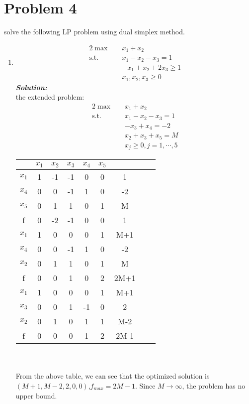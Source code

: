 \documentclass[paper=a4, fontsize=11pt]{scrartcl} %
\numberwithin{equation}{section} %
\numberwithin{figure}{section} %
\numberwithin{table}{section} %
\begin{document}
\section{Problem 4}
solve the following LP problem using dual simplex method.
\begin{enumerate}
\item
\begin{alignat}{2}          \nonumber
\max\quad & x_1+x_2 \\    \nonumber
\mbox{s.t.}\quad            \nonumber
& x_1-x_2-x_3 = 1\\        \nonumber
& -x_1+x_2+2x_3 \geq 1\\         \nonumber
& x_1,x_2,x_3 \geq 0
\end{alignat}
\emph{\textbf{Solution:}}\\
the extended problem:\\
\begin{alignat}{2}          \nonumber
\max\quad & x_1+x_2 \\    \nonumber
\mbox{s.t.}\quad            \nonumber
& x_1-x_2-x_3 = 1\\        \nonumber
& -x_3+x_4= -2\\         \nonumber
& x_2+x_3+x_5 = M\\          \nonumber
& x_j \geq 0, j = 1,\cdots,5
\end{alignat}

\begin{tabular}{|c|c|c|c|c|c|c|c|c|}
\hline &$x_1$&$x_2$&$x_3$&$x_4$&$x_5$&\\
\hline$x_1$&1&-1&-1&0&0&1\\
$x_4$&0&0&-1&1&0&-2\\
$x_5$&0&\Large{\textcircled{\small{1}}}&1&0&1&M\\
\hline f&0&-2&-1&0&0&1\\
\hline
\hline $x_1$&1& 0 &0& 0&1&M+1\\
$x_4$&0&0&\Large{\textcircled{\small{-1}}}&1&0&-2\\
$x_2$&0&1&1&0&1&M\\
\hline f & 0 & 0 & 1 & 0 &2 &2M+1\\
\hline
\hline $x_1$&1& 0 &0& 0&1&M+1\\
$x_3$&0&0&1&-1&0&2\\
$x_2$&0&1&0&1&1&M-2\\
\hline f & 0 & 0 & 0 & 1 &2 &2M-1\\
\hline
\end{tabular}
\\\\
From the above table, we can see that the optimized solution is $(M+1,M-2,2,0,0)$,$f_{max}=2M-1$. Since $M\rightarrow\infty$, the problem has no upper bound.



\end{enumerate}
\end{document}
